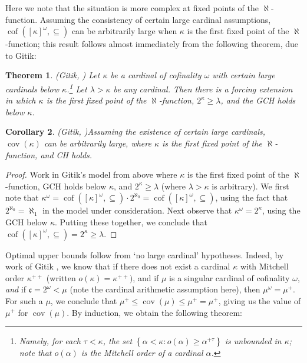 \documentclass{article}
\newtheorem{thm}{Theorem}[section]
\newtheorem{cor}[thm]{Corollary}
\newcommand{\lb}{\left\{}
\newcommand{\rb}{\right\}}
\DeclareMathOperator{\cof}{cof}
\begin{document}
Here we note that the situation is more complex at fixed points of the $\aleph$-function. Assuming the consistency of certain large cardinal assumptions, $\cof([\kappa]^\omega,\subseteq)$ can be arbitrarily large when $\kappa$ is the first fixed point of the $\aleph$-function; this result follows almost immediately from the following theorem, due to Gitik:

\begin{thm} (Gitik, \cite{Gitik:noBounds}) Let $\kappa$ be a cardinal of cofinality $\omega$ with certain large cardinals below $\kappa$.\footnote{Namely, for each $\tau<\kappa$, the set $\lb\alpha<\kappa:o(\alpha)\geq\alpha^{+\tau}\rb$ is unbounded in $\kappa$; note that $o(\alpha)$ is the Mitchell order of a cardinal $\alpha$.} Let $\lambda>\kappa$ be any cardinal. Then there is a forcing extension in which $\kappa$ is the first fixed point of the $\aleph$-function, $2^\kappa\geq\lambda$, and the \textsc{GCH} holds below $\kappa$.
\end{thm}

\begin{cor} (Gitik, \cite{Gitik:noBounds})\label{cor:noBounds}
    Assuming the existence of certain large cardinals, $\mathop{cov}(\kappa)$ can be arbitrarily large, where $\kappa$ is the first fixed point of the $\aleph$-function, and \textsc{CH} holds.
\end{cor}
\begin{proof}
    Work in Gitik's model from above where $\kappa$ is the first fixed point of the $\aleph$-function, \textsc{GCH} holds below $\kappa$, and $2^\kappa\geq\lambda$ (where $\lambda>\kappa$ is arbitrary). 
    We first note that $\kappa^\omega=\cof([\kappa]^\omega,\subseteq)\cdot2^{\aleph_0}=\cof([\kappa]^\omega,\subseteq)$, using the fact that $2^{\aleph_0}=\aleph_1$ in the model under consideration. Next observe that $\kappa^\omega=2^\kappa$, using the \textsc{GCH} below $\kappa$. Putting these together, we conclude that $\cof([\kappa]^\omega,\subseteq)=2^\kappa\geq\lambda$.
\end{proof}



Optimal upper bounds follow from `no large cardinal' hypotheses. 
Indeed, by work of Gitik \cite{Gitik:Strength}, we know that if there does not exist a cardinal $\kappa$ with Mitchell order $\kappa^{++}$ (written $o(\kappa)=\kappa^{++})$, and if $\mu$ is a singular cardinal of cofinality $\omega$, \emph{and} if $\mathfrak{c}=2^\omega<\mu$ (note the cardinal arithmetic assumption here), then $\mu^\omega=\mu^+$.  
For such a $\mu$, we conclude that $\mu^+\leq\mathop{cov}(\mu)\leq\mu^+=\mu^+$, giving us the value of $\mu^+$ for $\mathop{cov}(\mu)$.
By induction, we obtain the following theorem:
\end{document}
